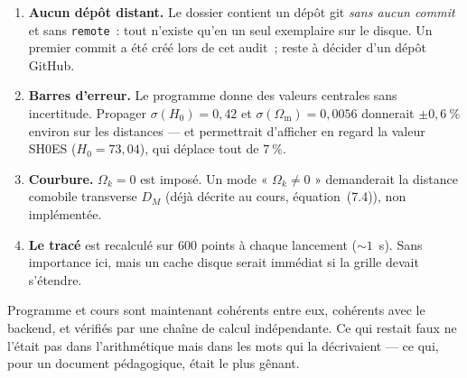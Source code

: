 \documentclass[11pt,a4paper]{report}
\newcommand{\Ok}{\Omega_{k}}
\newcommand{\Om}{\Omega_{\mathrm{m}}}
\newcommand{\Hzero}{H_{0}}
\begin{document}
\begin{enumerate}[topsep=3pt]
\item \textbf{Aucun dépôt distant.} Le dossier contient un dépôt git
\emph{sans aucun commit} et sans \texttt{remote}~: tout n'existe qu'en un seul
exemplaire sur le disque. Un premier commit a été créé lors de cet audit~;
reste à décider d'un dépôt GitHub.
\item \textbf{Barres d'erreur.} Le programme donne des valeurs centrales sans
incertitude. Propager $\sigma(\Hzero) = 0{,}42$ et $\sigma(\Om) = 0{,}0056$
donnerait $\pm0{,}6~\%$ environ sur les distances --- et permettrait d'afficher
en regard la valeur SH0ES ($\Hzero = 73{,}04$), qui déplace tout de $7~\%$.
\item \textbf{Courbure.} $\Ok = 0$ est imposé. Un mode « $\Ok\ne0$ »
demanderait la distance comobile transverse $D_{M}$ (déjà décrite au cours,
équation~(7.4)), non implémentée.
\item \textbf{Le tracé} est recalculé sur 600 points à chaque lancement
($\sim1$~s). Sans importance ici, mais un cache disque serait immédiat si la
grille devait s'étendre.
\end{enumerate}

\vfill
\begin{tcolorbox}[verdict,title={En résumé}]
Programme et cours sont maintenant cohérents entre eux, cohérents avec le
backend, et vérifiés par une chaîne de calcul indépendante. Ce qui restait
faux ne l'était pas dans l'arithmétique mais dans les mots qui la
décrivaient --- ce qui, pour un document pédagogique, était le plus gênant.
\end{tcolorbox}
\end{document}

